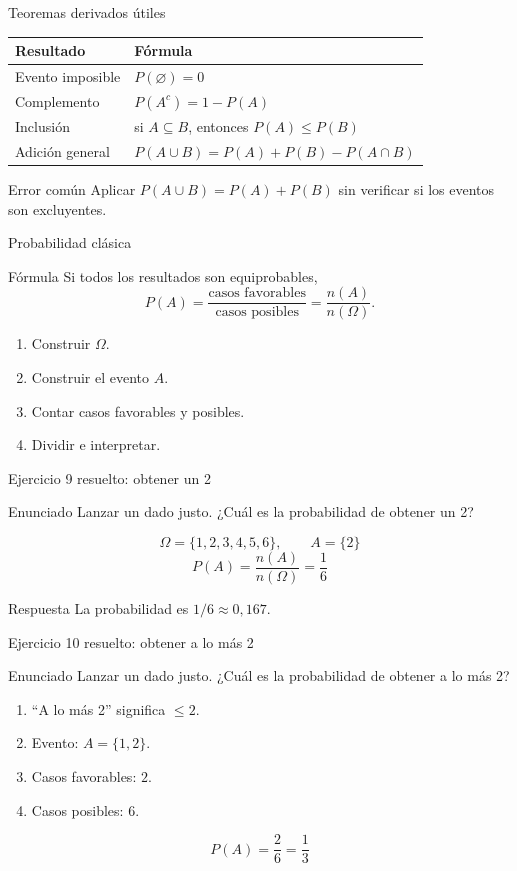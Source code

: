 \documentclass[aspectratio=169,11pt]{beamer}
\begin{document}
\begin{frame}{Teoremas derivados útiles}
\small
\begin{center}
\begin{tabular}{p{}p{}}
\toprule
Resultado & Fórmula \\
\midrule
Evento imposible & $P(\varnothing)=0$ \\
Complemento & $P(A^c)=1-P(A)$ \\
Inclusión & si $A\subseteq B$, entonces $P(A)\le P(B)$ \\
Adición general & $P(A\cup B)=P(A)+P(B)-P(A\cap B)$ \\
\bottomrule
\end{tabular}
\end{center}
\begin{alertblock}{Error común}
Aplicar $P(A\cup B)=P(A)+P(B)$ sin verificar si los eventos son excluyentes.
\end{alertblock}
\end{frame}

\begin{frame}{Probabilidad clásica}
\begin{block}{Fórmula}
Si todos los resultados son equiprobables,
\[
P(A)=\frac{\text{casos favorables}}{\text{casos posibles}}=\frac{n(A)}{n(\Omega)}.
\]
\end{block}
\begin{enumerate}
  \item Construir $\Omega$.
  \item Construir el evento $A$.
  \item Contar casos favorables y posibles.
  \item Dividir e interpretar.
\end{enumerate}
\end{frame}

\begin{frame}{Ejercicio 9 resuelto: obtener un 2}
\begin{block}{Enunciado}
Lanzar un dado justo. ¿Cuál es la probabilidad de obtener un 2?
\end{block}
\pause
\[
\Omega=\{1,2,3,4,5,6\},\qquad A=\{2\}
\]
\[
P(A)=\frac{n(A)}{n(\Omega)}=\frac{1}{6}
\]
\begin{exampleblock}{Respuesta}
La probabilidad es $1/6\approx0{,}167$.
\end{exampleblock}
\end{frame}

\begin{frame}{Ejercicio 10 resuelto: obtener a lo más 2}
\begin{block}{Enunciado}
Lanzar un dado justo. ¿Cuál es la probabilidad de obtener a lo más 2?
\end{block}
\pause
\begin{enumerate}
  \item ``A lo más 2'' significa $\le 2$.
  \item Evento: $A=\{1,2\}$.
  \item Casos favorables: $2$.
  \item Casos posibles: $6$.
\end{enumerate}
\[
P(A)=\frac{2}{6}=\frac{1}{3}
\]
\end{frame}
\end{document}
